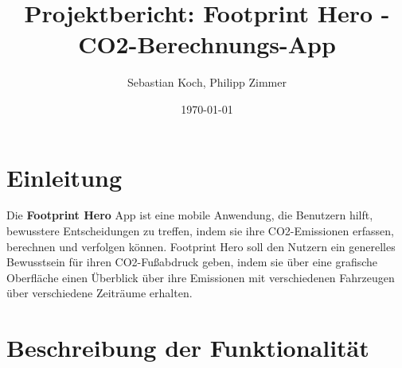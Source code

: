 \documentclass{article}
\title{Projektbericht: Footprint Hero - CO2-Berechnungs-App}
\author{Sebastian Koch, Philipp Zimmer}
\date{\today}
\begin{document}
\maketitle


\section{Einleitung}
Die \textbf{Footprint Hero} App ist eine mobile Anwendung, die Benutzern hilft, bewusstere Entscheidungen zu treffen, indem sie ihre CO2-Emissionen erfassen, berechnen und verfolgen können. Footprint Hero soll den Nutzern ein generelles Bewusstsein für ihren CO2-Fußabdruck geben, indem sie über eine grafische Oberfläche einen Überblick über ihre Emissionen mit verschiedenen Fahrzeugen über verschiedene Zeiträume erhalten.

\section{Beschreibung der Funktionalität}
\end{document}
